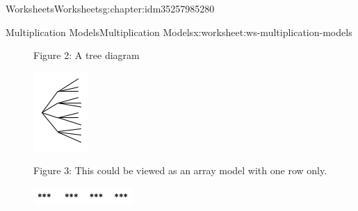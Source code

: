 \documentclass[twoside,11pt,]{book}
\begin{document}
\begin{chapterptx}{Worksheets}{}{Worksheets}{}{}{g:chapter:idm35257985280}
\begin{worksheet-section-numberless}{Multiplication Models}{}{Multiplication Models}{}{}{x:worksheet:ws-multiplication-models}
\begin{introduction}{}
\begin{description}
\item[{}]Figure 2: A tree diagram \begin{sidebyside}{1}{0.45}{0.45}{0}%
\begin{sbspanel}{0.1}%
\includegraphics[width=1\linewidth]{images/mult-tree.png}
\end{sbspanel}%
\end{sidebyside}%
\item[{}]Figure 3: This could be viewed as an array model with one row only. \begin{sidebyside}{1}{0.3}{0.3}{0}%
\begin{sbspanel}{0.4}%
\includegraphics[width=1\linewidth]{images/mult-one-row.png}

\end{sbspanel}
\end{sidebyside}
\end{description}
\end{introduction}
\end{worksheet-section-numberless}
\end{chapterptx}
\end{document}
